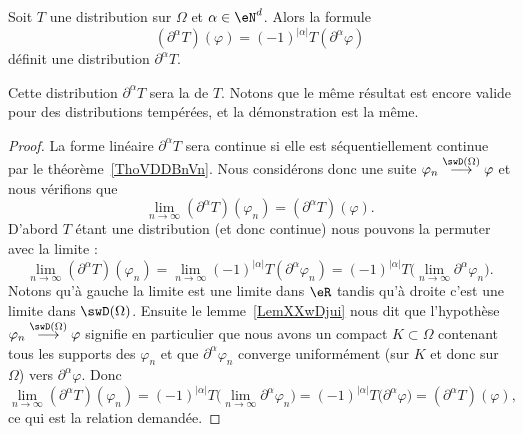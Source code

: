\begin{propositionDef} \label{PropKJLrfSX}
	Soit \( T\) une distribution sur \( \Omega\) et \( \alpha\in \eN^d\). Alors la formule
	\begin{equation}
		(\partial^{\alpha}T)(\varphi)=(-1)^{| \alpha |}T(\partial^{\alpha}\varphi)
	\end{equation}
	définit une distribution \( \partial^{\alpha}T\).

	Cette distribution \( \partial^{\alpha}T\) sera la  de \( T\). Notons que le même résultat est encore valide pour des distributions tempérées, et la démonstration est la même.
\end{propositionDef}

\begin{proof}
	La forme linéaire \( \partial^{\alpha}T\) sera continue si elle est séquentiellement continue par le théorème~\ref{ThoVDDBnVn}. Nous considérons donc une suite \( \varphi_n\stackrel{\swD(\Omega)}{\longrightarrow}\varphi\) et nous vérifions que
	\begin{equation}
		\lim_{n\to \infty} (\partial^{\alpha}T)(\varphi_n)=(\partial^{\alpha}T)(\varphi).
	\end{equation}
	D'abord \( T\) étant une distribution (et donc continue) nous pouvons la permuter avec la limite :
	\begin{equation}
		\lim_{n\to \infty} (\partial^{\alpha}T)(\varphi_n)=\lim_{n\to \infty} (-1)^{| \alpha |}T(\partial^{\alpha}\varphi_n)=(-1)^{| \alpha |}T\big( \lim_{n\to \infty} \partial^{\alpha}\varphi_n \big).
	\end{equation}
	Notons qu'à gauche la limite est une limite dans \( \eR\) tandis qu'à droite c'est une limite dans \( \swD(\Omega)\). Ensuite le lemme~\ref{LemXXwDjui} nous dit que l'hypothèse \( \varphi_n\stackrel{\swD(\Omega)}{\longrightarrow}\varphi\) signifie en particulier que nous avons un compact \( K\subset\Omega\) contenant tous les supports des \( \varphi_n\) et que \( \partial^{\alpha}\varphi_n\) converge uniformément (sur \( K\) et donc sur \( \Omega\)) vers \( \partial^{\alpha}\varphi\). Donc
	\begin{equation}
		\lim_{n\to \infty} (\partial^{\alpha}T)(\varphi_n)=(-1)^{| \alpha |}T\big( \lim_{n\to \infty} \partial^{\alpha}\varphi_n \big)=(-1)^{| \alpha |}T\big( \partial^{\alpha}\varphi \big)=(\partial^{\alpha}T)(\varphi),
	\end{equation}
	ce qui est la relation demandée.
\end{proof}

